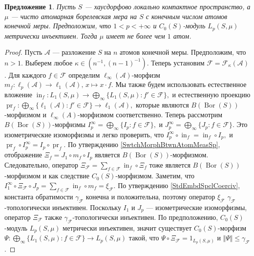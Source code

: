 \documentclass[12pt]{article}
\newtheorem{proposition}[theorem]{Предложение}
\begin{document}
\begin{proposition}\label{MetInjC0SModLpSmuOnFinAtmMeasSpCharac}
    Пусть $S$ --- хаусдорфово локально компактное пространство, а $\mu$ --- 
    чисто атомарная борелевская мера на $S$ с конечным числом атомов конечной 
    меры. Предположим, что $1<p<+\infty$ и $C_0(S)$-модуль $L_p(S,\mu)$ 
    метрически инъективен. Тогда $\mu$ имеет не более чем $1$ атом.
\end{proposition}
\begin{proof}
    Пусть $\mathcal{A}$ --- разложение $S$ на $n$ атомов конечной меры. 
    Предположим, что $n>1$. Выберем любое $\kappa\in(n^{-1}, (n-1)^{-1})$. 
    Теперь установим $\mathcal{F}=\mathcal{F}_{\kappa}(\mathcal{A})$. Для 
    каждого $f\in \mathcal{F}$ определим $\ell_\infty(\mathcal{A})$-морфизм 
    $
        m_f:
        \ell_p(\mathcal{A})\to\ell_1(\mathcal{A}),\,
        x\mapsto x\cdot f.
    $
    Мы также будем использовать естественное вложение 
    $
        \operatorname{in}_f:
        L_1(S,\mu)\to\bigoplus_\infty\{L_1(S,\mu):f'\in\mathcal{F}\},
    $
    и естественную проекцию
    $
        \operatorname{pr}_f:
        \bigoplus_\infty\{
            \ell_1(\mathcal{A}):f'\in\mathcal{F}
        \}\to\ell_1(\mathcal{A}),
    $
    которые являются $B(\operatorname{Bor}(S))$-морфизмом 
    и $\ell_\infty(A)$-морфизмом соответственно. Теперь 
    рассмотрим $B(\operatorname{Bor}(S))$-морфизмы 
    $
        I_p^\infty=\bigoplus_\infty\{I_p:f\in\mathcal{F}\},
    $
    и
    $
        J_p^\infty=\bigoplus_\infty\{J_p:f\in\mathcal{F}\}.
    $
    Это изометрические изоморфизмы и легко проверить, что 
    $
        I_p^\infty \circ \operatorname{in}_f=\operatorname{in}_f\circ I_p,
    $
    и
    $
        \operatorname{pr}_f\circ I_p^\infty=I_p\circ \operatorname{pr}_f.
    $
    По утверждению \ref{SwtchMorphBtwnAtomMeasSp}, 
    отображение $\Xi_f=J_1\circ m_f\circ I_p$ 
    является $B(\operatorname{Bor}(S))$-морфизмом. Следовательно, оператор 
    $
        \Xi_{\mathcal{F}}=\sum_{f\in\mathcal{F}}\operatorname{in}_f\circ \Xi_f
    $
    тоже является $B(\operatorname{Bor}(S))$-морфизмом и как 
    следствие $C_0(S)$-морфизмом. Заметим, что
    $
        I_1^\infty\circ\Xi_\mathcal{F}\circ J_p
        = \sum_{f\in\mathcal{F}} 
            \operatorname{in}_f\circ m_f 
        =\xi_{\mathcal{F}}.
    $
    По утверждению \ref{StdEmbdSpclCoerciv}, константа 
    обратимости $\gamma_{\mathcal{F}}$ конечна и положительна, 
    поэтому оператор $\xi_{\mathcal{F}}$ $\gamma_{\mathcal{F}}$-топологически 
    инъективен. Поскольку $I_1$ и $J_p$ --- изометрические изоморфизмы, 
    оператор $\Xi_{\mathcal{F}}$ также $\gamma_{\mathcal{F}}$-топологически 
    инъективен. По предположению, $C_0(S)$-модуль $L_p(S,\mu)$ 
    метрически инъективен, значит существует $C_0(S)$-морфизм 
    $
        \Psi:
        \bigoplus_\infty\{ L_1(S,\mu):f\in\mathcal{F}\}\to L_p(S,\mu)
    $
    такой, что $\Psi\circ \Xi_{\mathcal{F}}=1_{L_p(S,\mu)}$ 
    и $\Vert \Psi\Vert\leq \gamma_{\mathcal{F}}$.


\end{proof}
\end{document}
